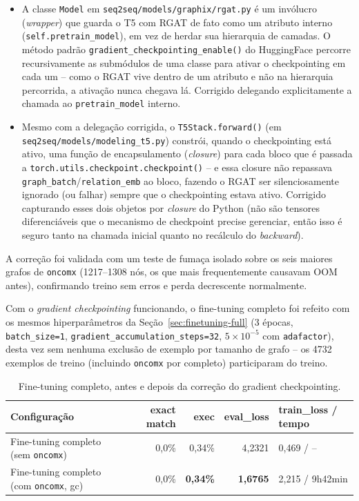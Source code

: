 \begin{itemize}
\item A classe \texttt{Model} em \texttt{seq2seq/models/graphix/rgat.py} é
um invólucro (\emph{wrapper}) que guarda o T5 com RGAT de fato como um
atributo interno (\texttt{self.pretrain\_model}), em vez de herdar sua
hierarquia de camadas. O método padrão
\texttt{gradient\_checkpointing\_enable()} do HuggingFace percorre
recursivamente as submódulos de uma classe para ativar o checkpointing em
cada um -- como o RGAT vive dentro de um atributo e não na hierarquia
percorrida, a ativação nunca chegava lá. Corrigido delegando
explicitamente a chamada ao \texttt{pretrain\_model} interno.
\item Mesmo com a delegação corrigida, o \texttt{T5Stack.forward()} (em
\texttt{seq2seq/models/modeling\_t5.py}) constrói, quando o checkpointing
está ativo, uma função de encapsulamento (\emph{closure}) para cada bloco
que é passada a \texttt{torch.utils.checkpoint.checkpoint()} -- e essa
closure não repassava \texttt{graph\_batch}/\texttt{relation\_emb} ao
bloco, fazendo o RGAT ser silenciosamente ignorado (ou falhar) sempre que
o checkpointing estava ativo. Corrigido capturando esses dois objetos por
\emph{closure} do Python (não são tensores diferenciáveis que o mecanismo
de checkpoint precise gerenciar, então isso é seguro tanto na chamada
inicial quanto no recálculo do \emph{backward}).
\end{itemize}

A correção foi validada com um teste de fumaça isolado sobre os seis
maiores grafos de \texttt{oncomx} (1217--1308 nós, os que mais
frequentemente causavam OOM antes), confirmando treino sem erros e perda
decrescente normalmente.

Com o \emph{gradient checkpointing} funcionando, o fine-tuning completo foi
refeito com os mesmos hiperparâmetros da Seção~\ref{sec:finetuning-full}
(3 épocas, \texttt{batch\_size=1}, \texttt{gradient\_accumulation\_steps=32},
$5\times10^{-5}$ com \texttt{adafactor}), desta vez sem nenhuma exclusão de
exemplo por tamanho de grafo -- os 4732 exemplos de treino (incluindo
\texttt{oncomx} por completo) participaram do treino.

\begin{table}[h]
\centering
\caption{Fine-tuning completo, antes e depois da correção do gradient checkpointing.}
\label{tab:finetuning-full-gc}
\begin{tabular}{lrrrl}
\toprule
\textbf{Configuração} & \textbf{exact match} & \textbf{exec} & \textbf{eval\_loss} & \textbf{train\_loss / tempo} \\
\midrule
Fine-tuning completo (sem \texttt{oncomx}) & 0,0\% & 0,34\% & 4,2321 & 0,469 / -- \\
Fine-tuning completo (com \texttt{oncomx}, gc) & 0,0\% & \textbf{0,34\%} & \textbf{1,6765} & 2,215 / 9h42min \\
\bottomrule
\end{tabular}
\end{table}

